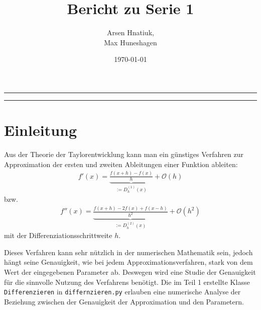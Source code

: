 \documentclass[smallheadings]{scrartcl}
\title{Bericht zu Serie 1}
\author{%
  Arsen Hnatiuk,\\%
  Max Huneshagen 
}
\date{\today}
\begin{document}
\maketitle
\tableofcontents
\bigskip

\hrule
\hrule


\section{Einleitung}
Aus der Theorie der Taylorentwicklung kann man ein günstiges Verfahren zur Approximation der ersten und zweiten Ableitungen einer Funktion ableiten: 
\begin{align}
\label{eq:1_abl}
f'(x)=\underbrace{\frac{f(x+h)-f(x)}{h}}_{:=D_h^{(1)}(x)}+\mathcal{O}(h)
\end{align}
bzw.
\begin{align}
\label{eq:2_abl}
f''(x)=\underbrace{\frac{f(x+h)-2f(x)+f(x-h)}{h^2}}_{:=D_h^{(2)}(x)}+\mathcal{O}(h^2)
\end{align}
mit der Differenziationsschrittweite $h$.

Dieses Verfahren kann sehr nützlich in der numerischen Mathematik sein, jedoch hängt seine Genauigkeit, wie bei jedem Approximationsverfahren, stark von dem Wert der eingegebenen Parameter ab. Deswegen wird eine Studie der Genauigkeit für die sinnvolle Nutzung des Verfahrens benötigt. Die im Teil 1 erstellte Klasse \texttt{Differenzieren} in \texttt{differnzieren.py} erlauben eine numerische Analyse der Beziehung zwischen der Genauigkeit der Approximation und den Parametern. 
\end{document}
